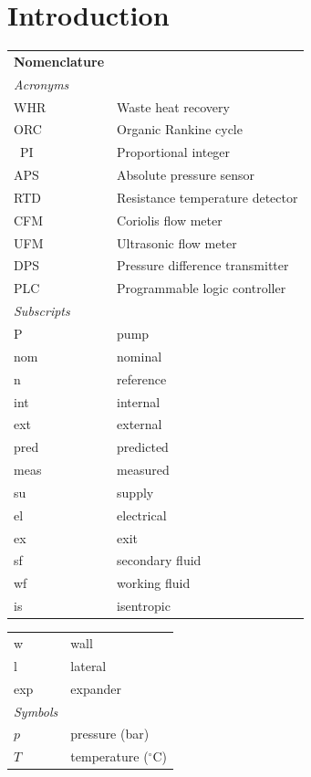 \documentclass[final,3p,times,review]{elsarticle}
\begin{document}

\section{Introduction}
\label{Intro}


\begin{table}[h!]
\begin{tabular}{lp{7.5cm}}
\textbf{Nomenclature}\\
\textit{Acronyms} \\
WHR & Waste heat recovery \\
ORC & Organic Rankine cycle\\\ 
PI  & Proportional integer \\
APS & Absolute pressure sensor \\
RTD & Resistance temperature detector \\
CFM & Coriolis flow meter \\
UFM & Ultrasonic flow meter \\
DPS & Pressure difference transmitter \\
PLC & Programmable logic controller\\
\textit{Subscripts} \\
P & pump \\
nom & nominal \\
n  & reference \\
int & internal\\
ext & external\\
pred & predicted \\
meas & measured \\
su  & supply \\
el & electrical \\
ex & exit \\
sf & secondary fluid\\
wf & working fluid \\
is  & isentropic \\
\end{tabular}
\begin{tabular}{lp{7.5cm}}
w  & wall \\
l  & lateral \\
exp & expander \\
\textit{Symbols} \\
$p$ & pressure (bar)\\
$T$ & temperature ($^{\circ}$C)\\

\end{tabular}
\end{table}
\end{document}
